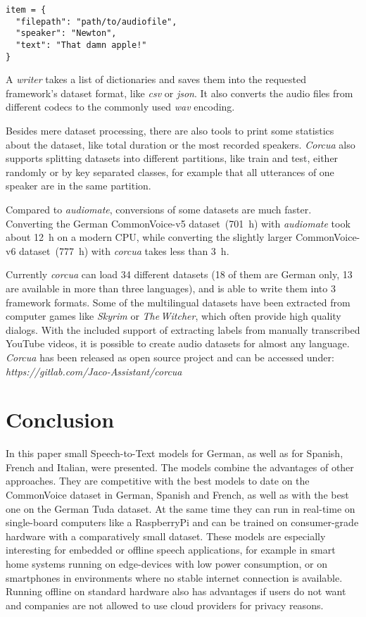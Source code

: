 \noindent
\begin{minipage}{\linewidth}
\begin{lstlisting}
item = {
  "filepath": "path/to/audiofile",
  "speaker": "Newton",
  "text": "That damn apple!"
}	
\end{lstlisting}
\end{minipage}

A \textit{writer} takes a list of dictionaries and saves them into the requested framework's dataset format, like \textit{csv} or \textit{json}. It also converts the audio files from different codecs to the commonly used \textit{wav} encoding.

Besides mere dataset processing, there are also tools to print some statistics about the dataset, like total duration or the most recorded speakers. \textit{Corcua} also supports splitting datasets into different partitions, like train and test, either randomly or by key separated classes, for example that all utterances of one speaker are in the same partition.

\vspace{9pt}
Compared to \textit{audiomate}, conversions of some datasets are much faster. Converting the German CommonVoice-v5 dataset~(\SI{701}{\hour}) with \textit{audiomate} took about \SI{12}{\hour} on a modern CPU, while converting the slightly larger CommonVoice-v6 dataset~(\SI{777}{\hour}) with \textit{corcua} takes less than \SI{3}{\hour}. 

Currently \textit{corcua} can load 34 different datasets (18 of them are German only, 13 are available in more than three languages), and is able to write them into 3 framework formats.
Some of the multilingual datasets have been extracted from computer games like \textit{Skyrim} or \textit{The\,Witcher}, which often provide high quality dialogs. With the included support of extracting labels from  manually transcribed YouTube videos, it is possible to create audio datasets for almost any language.
\textit{Corcua} has been released as open source project and can be accessed under: \textit{https://gitlab.com/Jaco-Assistant/corcua}

\section{Conclusion}
\label{sec:conclu}

In this paper small Speech-to-Text models for German, as well as for Spanish, French and Italian, were presented. The models combine the advantages of other approaches. They are competitive with the best models to date on the CommonVoice dataset in German, Spanish and French, as well as with the best one on the German Tuda dataset. At the same time they can run in real-time on single-board computers like a RaspberryPi and can be trained on consumer-grade hardware with a comparatively small dataset.
These models are especially interesting for embedded or offline speech applications, for example in smart home systems running on edge-devices with low power consumption, or on smartphones in environments where no stable internet connection is available. Running offline on standard hardware also has advantages if users do not want and companies are not allowed to use cloud providers for privacy reasons.

